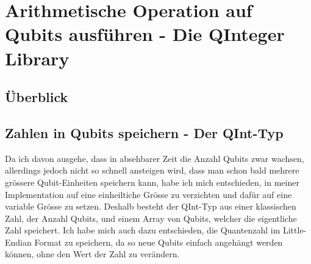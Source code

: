 \chapter{Arithmetische Operation auf Qubits ausführen - Die QInteger Library}
\section{Überblick}

\section{Zahlen in Qubits speichern - Der QInt-Typ}
Da ich davon ausgehe, dass in absehbarer Zeit die Anzahl Qubits zwar wachsen, allerdings jedoch nicht so schnell ansteigen wird, dass man schon bald mehrere grössere Qubit-Einheiten speichern kann, habe ich mich entschieden, in meiner Implementation auf eine einheiltiche Grösse zu verzichten und dafür auf eine variable Grösse zu setzen. Deshalb besteht der QInt-Typ aus einer klassischen Zahl, der Anzahl Qubits, und einem Array von Qubits, welcher die eigentliche Zahl speichert. Ich habe mich auch dazu entschieden, die Quantenzahl im Little-Endian Format zu speichern, da so neue Qubits einfach angehängt werden können, ohne den Wert der Zahl zu verändern. 



